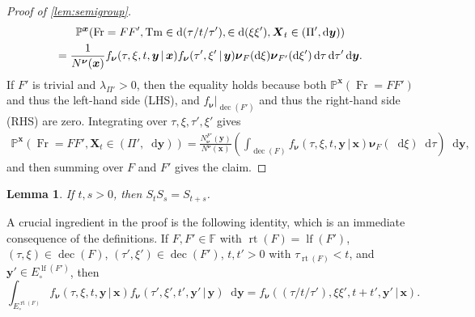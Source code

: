 \documentclass[reqno,draft]{amsart}
\numberwithin{equation}{section}
\theoremstyle{plain}
\newtheorem{lemma}[theorem]{Lemma}
\theoremstyle{remark}
\renewcommand{\P}{\mathbb{P}} %
\newcommand*\diff{\mathop{}\!\mathrm{d}}
\newcommand{\fpart}{\Pi} %
\DeclareMathOperator{\lf}{lf}
\DeclareMathOperator{\rt}{rt}
\DeclareMathOperator{\dcb}{dec}
\newcommand{\semi}{S}
\DeclareMathOperator{\fr}{Fr}
\DeclareMathOperator{\tm}{Tm}
\let\sp\relax %
\DeclareMathOperator{\sp}{Sp}
\newcommand{\fnu}{f_{\boldsymbol \nu}}
\begin{document}
\begin{proof}[Proof of \cref{lem:semigroup}]
    \begin{multline*}
        \P^{\boldsymbol x}(\fr = FF', \tm \in \diff (\tau / t / \tau'),  \sp \in \diff (\xi\xi'), \boldsymbol X_t \in (\fpart',\diff \boldsymbol y)) \\
                                                                        = \frac{1}{N^{\boldsymbol \nu}(\boldsymbol x)} \fnu(\tau,\xi,t,\boldsymbol y \,\vert\,\boldsymbol x) \fnu(\tau',\xi' \,\vert\,\boldsymbol y) \boldsymbol \nu_F(\diff \xi) \boldsymbol \nu_{F'}(\diff \xi')\diff \tau\diff \tau'\diff \boldsymbol y.
    \end{multline*}
    If $F'$ is trivial and $\lambda_{\fpart'} > 0$, then the equality holds because both $\P^{\boldsymbol x}(\fr = FF')$ and thus the left-hand side (LHS), and $\fnu\vert_{\dcb(F')}$ and thus the right-hand side (RHS) are zero. Integrating over $\tau,\xi,\tau',\xi'$ gives
    \begin{align*}
        \P^{\boldsymbol x}(\fr = FF', \boldsymbol X_t \in (\fpart',\diff \boldsymbol y)) = \frac{N^{F'}_{\boldsymbol \nu}(\boldsymbol y)}{N^{\boldsymbol \nu}(\boldsymbol x)} \left( \int_{\dcb(F)} \fnu(\tau,\xi,t,\boldsymbol y \,\vert\,\boldsymbol x) \boldsymbol \nu_F(\diff \xi) \diff \tau\right) \diff \boldsymbol y,
    \end{align*}
    and then summing over $F$ and $F'$ gives the claim.
\end{proof}

\begin{lemma}\label{lem:markov}
    If $t, s > 0$, then $\semi_t \semi_s = \semi_{t+s}$.
\end{lemma}
A crucial ingredient in the proof is the following identity, which is an immediate consequence of the definitions. If $F, F'\in \mathbb{F}$ with $\rt(F) = \lf(F')$, $(\tau,\xi) \in \dcb(F)$, $(\tau',\xi') \in \dcb(F')$, $t,t'> 0$ with $\tau_{\rt(F)} < t$, and $\boldsymbol y' \in E^{\lf(F')}_\circ $, then
\begin{equation}\label{eq:fnu_conv}
    \int_{E^{\rt(F)}_\circ } \fnu(\tau,\xi,t,\boldsymbol y \,\vert\,\boldsymbol x) \fnu(\tau',\xi',t',\boldsymbol y' \,\vert\,\boldsymbol y) \diff \boldsymbol y = \fnu((\tau / t / \tau'),\xi\xi', t+t',\boldsymbol y' \,\vert\,\boldsymbol x).
\end{equation}
\end{document}
